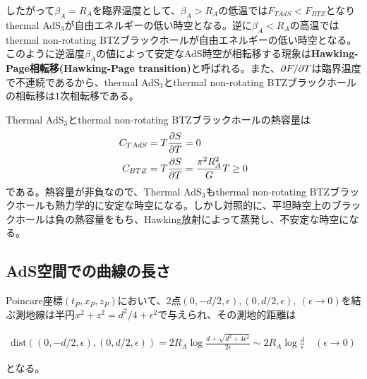 したがって$\beta_A=R_A$を臨界温度として、$\beta_A>R_A$の低温では$F_{TAdS}<F_{BTZ}$となりthermal AdS$_3$が自由エネルギーの低い時空となる。逆に$\beta_A<R_A$の高温ではthermal non-rotating BTZブラックホールが自由エネルギーの低い時空となる。このように逆温度$\beta_A$の値によって安定なAdS時空が相転移する現象は\textbf{Hawking-Page相転移(Hawking-Page transition)}\cite{Hawking:1982dh}と呼ばれる。また、$\partial F/\partial T$は臨界温度で不連続であるから、thermal AdS$_3$とthermal non-rotating BTZブラックホールの相転移は$1$次相転移である。

Thermal AdS$_3$とthermal non-rotating BTZブラックホールの熱容量は
\begin{align}
C_{TAdS}&=T\frac{\partial S}{\partial T}=0\\
C_{BTZ}&=T\frac{\partial S}{\partial T}=\frac{\pi^2R_A^2}{G}T\geq 0
\end{align}
である。熱容量が非負なので、Thermal AdS$_3$もthermal non-rotating BTZブラックホールも熱力学的に安定な時空になる。しかし対照的に、平坦時空上のブラックホールは負の熱容量をもち、Hawking放射によって蒸発し、不安定な時空になる。

\subsection{AdS空間での曲線の長さ}
Poincare座標$(t_P,x_P,z_P)$において、2点$(0,-d/2,\epsilon),(0,d/2,\epsilon),\ (\epsilon\to 0)$を結ぶ測地線は半円$x^2+z^2=d^2/4+\epsilon^2$で与えられ、その測地的距離は
\begin{oframed}
\begin{align}\label{geodlengthPoincare}
\text{dist}((0,-d/2,\epsilon),(0,d/2,\epsilon))=2R_A \log\frac{d+\sqrt{d^2+4\epsilon^2}}{2\epsilon}\sim 2R_A\log\frac{d}{\epsilon}\quad (\epsilon\to 0)
\end{align}
\end{oframed}
となる。

